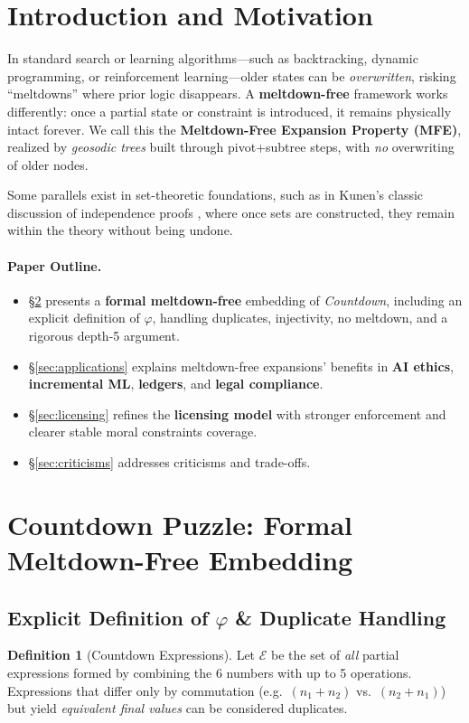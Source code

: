 \documentclass[acmsmall]{acmart}
\theoremstyle{definition}
\newtheorem{definition}[theorem]{Definition}
\theoremstyle{remark}
\begin{document}
\section{Introduction and Motivation}
In standard search or learning algorithms—such as backtracking, dynamic programming,
or reinforcement learning—older states can be \emph{overwritten}, risking
“meltdowns” where prior logic disappears. A \textbf{meltdown-free} framework
works differently: once a partial state or constraint is introduced, it remains
physically intact forever. We call this the \textbf{Meltdown-Free Expansion
Property (MFE)}, realized by \emph{geosodic trees} built through pivot+subtree
steps, with \emph{no} overwriting of older nodes.

Some parallels exist in set-theoretic foundations, such as in Kunen’s classic
discussion of independence proofs \cite{kunen1980settheory}, where once sets
are constructed, they remain within the theory without being undone.

\paragraph{Paper Outline.}
\begin{itemize}[leftmargin=*]
\item \S\ref{sec:countdown-proof} presents a \textbf{formal meltdown-free}
      embedding of \emph{Countdown}, including an explicit definition of $\varphi$,
      handling duplicates, injectivity, no meltdown, and a rigorous depth-5 argument.
\item \S\ref{sec:applications} explains meltdown-free expansions’ benefits in
      \textbf{AI ethics}, \textbf{incremental ML}, \textbf{ledgers}, and
      \textbf{legal compliance}.
\item \S\ref{sec:licensing} refines the \textbf{licensing model} with stronger
      enforcement and clearer stable moral constraints coverage.
\item \S\ref{sec:criticisms} addresses criticisms and trade-offs.
\end{itemize}

\section{Countdown Puzzle: Formal Meltdown-Free Embedding}
\label{sec:countdown-proof}

\subsection{Explicit Definition of $\varphi$ \& Duplicate Handling}
\begin{definition}[Countdown Expressions]
\label{def:countdown-expr}
Let $\mathcal{E}$ be the set of \emph{all} partial expressions formed by combining
the 6 numbers with up to 5 operations. Expressions that differ only by commutation
(e.g.\ $(n_1 + n_2)$ vs.\ $(n_2 + n_1)$) but yield \emph{equivalent final values}
can be considered duplicates.
\end{definition}
\end{document}
